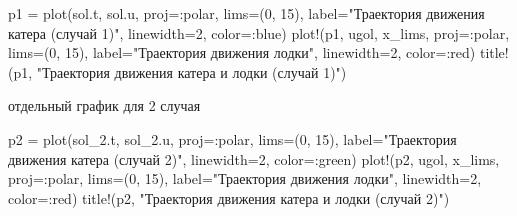 \documentclass[
  12pt,
  a4paper,
  DIV=11,
  numbers=noendperiod]{scrreprt}
\newenvironment{Shaded}{\begin{snugshade}}{\end{snugshade}}
\newcommand{\FloatTok}[1]{\textcolor[rgb]{0.68,0.00,0.00}{#1}}
\newcommand{\FunctionTok}[1]{\textcolor[rgb]{0.28,0.35,0.67}{#1}}
\newcommand{\NormalTok}[1]{\textcolor[rgb]{0.00,0.23,0.31}{#1}}
\newcommand{\OperatorTok}[1]{\textcolor[rgb]{0.37,0.37,0.37}{#1}}
\newcommand{\StringTok}[1]{\textcolor[rgb]{0.13,0.47,0.30}{#1}}
\begin{document}
\begin{Shaded}
\begin{Highlighting}[]
\NormalTok{p1 }\OperatorTok{=} \FunctionTok{plot}\NormalTok{(sol.t, sol.u, proj}\OperatorTok{=:}\NormalTok{polar, lims}\OperatorTok{=}\NormalTok{(}\FloatTok{0}\NormalTok{, }\FloatTok{15}\NormalTok{),}
\NormalTok{          label}\OperatorTok{=}\StringTok{"Траектория движения катера (случай 1)"}\NormalTok{,}
\NormalTok{          linewidth}\OperatorTok{=}\FloatTok{2}\NormalTok{, color}\OperatorTok{=:}\NormalTok{blue)}
\FunctionTok{plot!}\NormalTok{(p1, ugol, x\_lims, proj}\OperatorTok{=:}\NormalTok{polar, lims}\OperatorTok{=}\NormalTok{(}\FloatTok{0}\NormalTok{, }\FloatTok{15}\NormalTok{),}
\NormalTok{      label}\OperatorTok{=}\StringTok{"Траектория движения лодки"}\NormalTok{,}
\NormalTok{      linewidth}\OperatorTok{=}\FloatTok{2}\NormalTok{, color}\OperatorTok{=:}\NormalTok{red)}
\FunctionTok{title!}\NormalTok{(p1, }\StringTok{"Траектория движения катера и лодки (случай 1)"}\NormalTok{)}
\end{Highlighting}
\end{Shaded}



отдельный график для 2 случая

\begin{Shaded}
\begin{Highlighting}[]
\NormalTok{p2 }\OperatorTok{=} \FunctionTok{plot}\NormalTok{(sol\_2.t, sol\_2.u, proj}\OperatorTok{=:}\NormalTok{polar, lims}\OperatorTok{=}\NormalTok{(}\FloatTok{0}\NormalTok{, }\FloatTok{15}\NormalTok{),}
\NormalTok{          label}\OperatorTok{=}\StringTok{"Траектория движения катера (случай 2)"}\NormalTok{,}
\NormalTok{          linewidth}\OperatorTok{=}\FloatTok{2}\NormalTok{, color}\OperatorTok{=:}\NormalTok{green)}
\FunctionTok{plot!}\NormalTok{(p2, ugol, x\_lims, proj}\OperatorTok{=:}\NormalTok{polar, lims}\OperatorTok{=}\NormalTok{(}\FloatTok{0}\NormalTok{, }\FloatTok{15}\NormalTok{),}
\NormalTok{      label}\OperatorTok{=}\StringTok{"Траектория движения лодки"}\NormalTok{,}
\NormalTok{      linewidth}\OperatorTok{=}\FloatTok{2}\NormalTok{, color}\OperatorTok{=:}\NormalTok{red)}
\FunctionTok{title!}\NormalTok{(p2, }\StringTok{"Траектория движения катера и лодки (случай 2)"}\NormalTok{)}
\end{Highlighting}
\end{Shaded}


\end{document}
